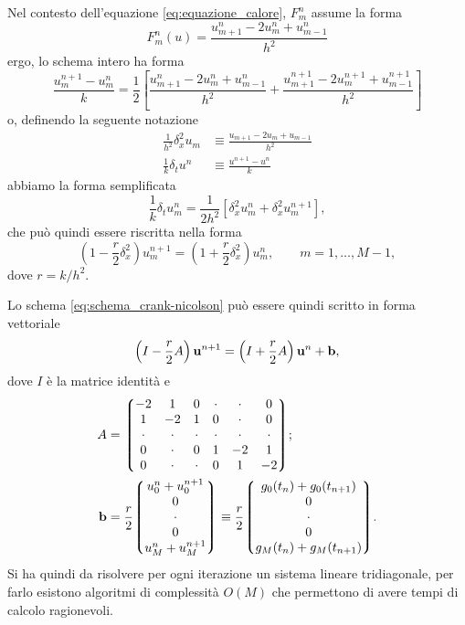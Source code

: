 \documentclass[10pt,a4paper]{article}
\begin{document}
Nel contesto dell'equazione \eqref{eq:equazione_calore}, $F_m^n$ assume la forma
\begin{equation}
	F_m^n(u) = \frac{u_{m+1}^n - 2u_m^n + u_{m-1}^n}{h^2}
\end{equation}
ergo, lo schema intero ha forma
\begin{equation}
	\frac{u_m^{n+1}-u_m^n}{k} = \frac{1}{2} \left[\frac{u_{m+1}^n - 2u_m^n + u_{m-1}^n}{h^2} + \frac{u_{m+1}^{n+1} - 2u_m^{n+1} + u_{m-1}^{n+1}}{h^2}  \right]
\end{equation}
o, definendo la seguente notazione
\begin{align}
	\frac{1}{h^2}\delta_x^2 u_m &\equiv \frac{u_{m+1}-2u_m+u_{m-1}}{h^2}\\
	\frac{1}{k}\delta_t u^n &\equiv \frac{u^{n+1}-u^n}{k}
\end{align}
abbiamo la forma semplificata
\begin{equation}
	\frac{1}{k} \delta_t u_m^n = \frac{1}{2h^2}[\delta_x^2 u_m^n + \delta_x^2 u_m^{n+1}],
	\label{eq:crank_semplificato}
\end{equation}
che può quindi essere riscritta nella forma
\begin{equation}
	\left(1-\frac{r}{2}\delta_x^2\right) u_m^{n+1} = \left(1+\frac{r}{2} \delta_x^2\right) u_m^n, \quad\quad m = 1,\ldots,M-1,
	\label{eq:schema_crank-nicolson}
\end{equation}
dove $r = k/h^2$.

Lo schema \eqref{eq:schema_crank-nicolson} può essere quindi scritto in forma vettoriale
\begin{equation}
	\left(I - \frac{r}{2} A\right)\vb{u}^{n+1} = \left(I + \frac{r}{2} A\right)\vb{u}^n + \vb{b},
\end{equation}
dove $I$ è la matrice identità e
\begin{align}
	A &= \mqty*(-2 & 1 & 0 & \cdot & \cdot & 0 \\ 1 & -2 & 1 & 0 & \cdot & 0 \\ \cdot & \cdot & \cdot & \cdot & \cdot & \cdot \\ 0 & \cdot & 0 & 1 & -2 & 1 \\ 0 & \cdot & \cdot & 0 & 1 & -2);\label{eq:A_calore_CN}\\
	\vb{b} &= \frac{r}{2}\mqty*(u_0^n + u_0^{n+1} \\ 0 \\ \cdot \\ 0 \\ u_M^n + u_M^{n+1}) \equiv \frac{r}{2}\mqty*(g_0(t_n) + g_0(t_{n+1}) \\ 0 \\ \cdot \\ 0 \\ g_M(t_n) + g_M(t_{n+1})).
\end{align}
Si ha quindi da risolvere per ogni iterazione un sistema lineare tridiagonale, per farlo esistono algoritmi di complessità $O(M)$ che permettono di avere tempi di calcolo ragionevoli.
\end{document}
